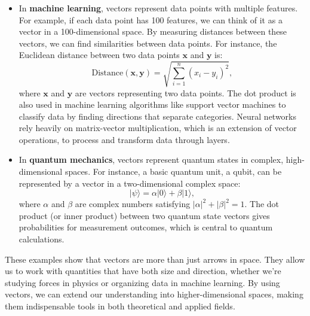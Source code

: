 \begin{itemize}
    \item In \textbf{machine learning}, vectors represent data points with multiple features. For example, if each data point has 100 features, we can think of it as a vector in a 100-dimensional space. By measuring distances between these vectors, we can find similarities between data points. For instance, the Euclidean distance between two data points \( \mathbf{x} \) and \( \mathbf{y} \) is:
    \[
    \text{Distance}(\mathbf{x}, \mathbf{y}) = \sqrt{\sum_{i=1}^n (x_i - y_i)^2},
    \]
    where \( \mathbf{x} \) and \( \mathbf{y} \) are vectors representing two data points. The dot product is also used in machine learning algorithms like support vector machines to classify data by finding directions that separate categories. Neural networks rely heavily on matrix-vector multiplication, which is an extension of vector operations, to process and transform data through layers.

    \item In \textbf{quantum mechanics}, vectors represent quantum states in complex, high-dimensional spaces. For instance, a basic quantum unit, a qubit, can be represented by a vector in a two-dimensional complex space:
    \[
    |\psi\rangle = \alpha |0\rangle + \beta |1\rangle,
    \]
    where \( \alpha \) and \( \beta \) are complex numbers satisfying \( |\alpha|^2 + |\beta|^2 = 1 \). The dot product (or inner product) between two quantum state vectors gives probabilities for measurement outcomes, which is central to quantum calculations.
\end{itemize}

\noindent These examples show that vectors are more than just arrows in space. They allow us to work with quantities that have both size and direction, whether we're studying forces in physics or organizing data in machine learning. By using vectors, we can extend our understanding into higher-dimensional spaces, making them indispensable tools in both theoretical and applied fields.


